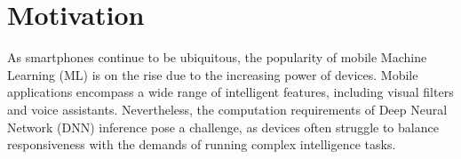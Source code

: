 \chapter{Motivation}
As smartphones continue to be ubiquitous, the popularity of mobile Machine Learning (ML) 
is on the rise due to the increasing power of devices. Mobile applications encompass 
a wide range of intelligent features, including visual filters and voice assistants. 
Nevertheless, the computation requirements of Deep Neural Network (DNN) inference 
pose a challenge, as devices often struggle to balance responsiveness with the demands
of running complex intelligence tasks.


